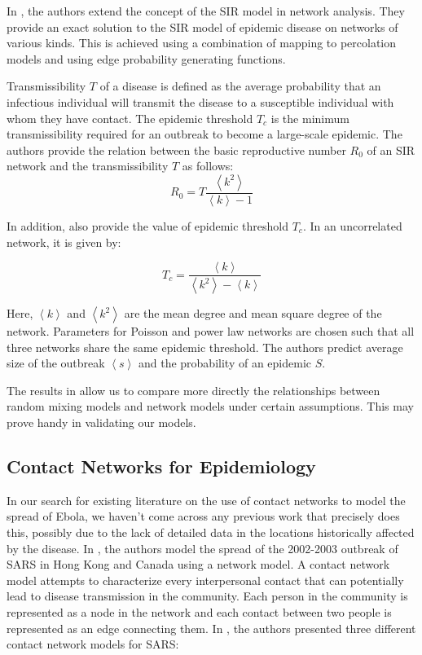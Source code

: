 \documentclass[10pt, journal,onecolumn]{IEEEtran}
\begin{document}
In \citep{newman2002spread}, the authors extend the concept of the SIR model in network analysis.
They provide an exact solution to the SIR model of epidemic disease on networks of various kinds.
This is achieved using a combination of mapping to percolation models and using edge probability generating functions.

Transmissibility $T$ of a disease is defined as the average probability that an infectious
individual will transmit the disease to a susceptible individual with whom they have contact.
The epidemic threshold $T_c$ is the minimum transmissibility required for an outbreak to become
a large-scale epidemic. The authors provide the relation between the basic reproductive number
$R_0$ of an SIR network and the transmissibility $T$ as follows:
\[
R_0 = T  \dfrac{\left\langle k^2 \right\rangle}{\left\langle k \right\rangle-1}
\]

In addition, \citep{newman2002spread} also provide the value of epidemic threshold $T_c$.  In an uncorrelated network, it is given by:

\[
T_c =\dfrac{\left\langle k \right\rangle}{\left\langle k^2 \right\rangle - \left\langle k \right\rangle}
\]

Here, $\left\langle k \right\rangle$ and $\left\langle k^2 \right\rangle$ are the mean degree and
mean square degree of the network. Parameters for Poisson and power law networks are chosen such
that all three networks share the same epidemic threshold. The authors predict average size
of the outbreak $\left\langle s \right\rangle$ and the probability of an epidemic $S$.

The results in \citep{newman2002spread} allow us to compare more directly the relationships between
random mixing models and network models under certain assumptions. This may prove handy in
validating our models.


\subsection{\textbf{Contact Networks for Epidemiology \citep{meyers2005network}}}

In our search for existing literature on the use of contact networks to model the spread of Ebola, we haven't come
across any previous work that precisely does this, possibly due to the lack of detailed data in the
locations historically affected by the disease.
In \citep{meyers2005network}, the authors model the spread of the 2002-2003
outbreak of SARS in Hong Kong and Canada using a network model. A contact network model attempts to
characterize every interpersonal contact that can potentially lead to disease transmission in the
community. Each person in the community is represented as a node in the network and each contact between
two people is represented as an edge connecting them.
In \citep{meyers2005network}, the authors presented three different contact network models for SARS:
\end{document}
